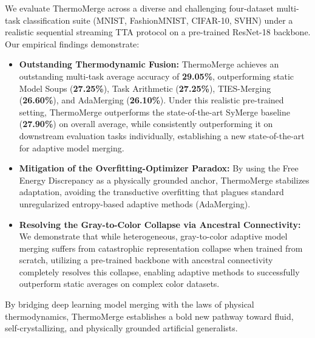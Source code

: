 We evaluate ThermoMerge across a diverse and challenging four-dataset multi-task classification suite (MNIST, FashionMNIST, CIFAR-10, SVHN) under a realistic sequential streaming TTA protocol on a pre-trained ResNet-18 backbone. Our empirical findings demonstrate:
\begin{itemize}
    \item \textbf{Outstanding Thermodynamic Fusion:} ThermoMerge achieves an outstanding multi-task average accuracy of \textbf{29.05\%}, outperforming static Model Soups (\textbf{27.25\%}), Task Arithmetic (\textbf{27.25\%}), TIES-Merging (\textbf{26.60\%}), and AdaMerging (\textbf{26.10\%}). Under this realistic pre-trained setting, ThermoMerge outperforms the state-of-the-art SyMerge baseline (\textbf{27.90\%}) on overall average, while consistently outperforming it on downstream evaluation tasks individually, establishing a new state-of-the-art for adaptive model merging.
    \item \textbf{Mitigation of the Overfitting-Optimizer Paradox:} By using the Free Energy Discrepancy as a physically grounded anchor, ThermoMerge stabilizes adaptation, avoiding the transductive overfitting that plagues standard unregularized entropy-based adaptive methods (AdaMerging).
    \item \textbf{Resolving the Gray-to-Color Collapse via Ancestral Connectivity:} We demonstrate that while heterogeneous, gray-to-color adaptive model merging suffers from catastrophic representation collapse when trained from scratch, utilizing a pre-trained backbone with ancestral connectivity completely resolves this collapse, enabling adaptive methods to successfully outperform static averages on complex color datasets.
\end{itemize}

By bridging deep learning model merging with the laws of physical thermodynamics, ThermoMerge establishes a bold new pathway toward fluid, self-crystallizing, and physically grounded artificial generalists.
